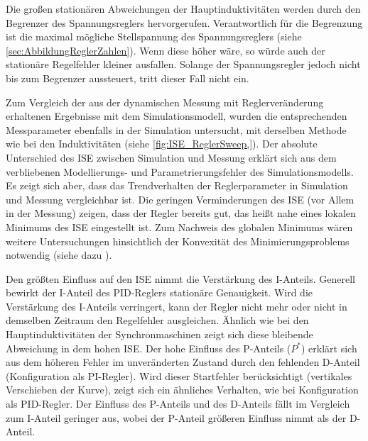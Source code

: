 Die großen stationären Abweichungen der Hauptinduktivitäten werden durch den Begrenzer des Spannungsreglers hervorgerufen. Verantwortlich für die Begrenzung ist die maximal mögliche Stellspannung des Spannungsreglers (siehe \cref{sec:AbbildungReglerZahlen}). Wenn diese höher wäre, so würde auch der stationäre Regelfehler kleiner ausfallen. Solange der Spannungsregler jedoch nicht bis zum Begrenzer aussteuert, tritt dieser Fall nicht ein.

Zum Vergleich der aus der dynamischen Messung mit Reglerveränderung erhaltenen Ergebnisse mit dem Simulationsmodell, wurden die entsprechenden Messparameter ebenfalls in der Simulation untersucht, mit derselben Methode wie bei den Induktivitäten (siehe \cref{fig:ISE_ReglerSweep,}). Der absolute Unterschied des ISE zwischen Simulation und Messung erklärt sich aus dem verbliebenen Modellierungs- und Parametrierungsfehler des Simulationsmodells. Es zeigt sich aber, dass das Trendverhalten der Reglerparameter in Simulation und Messung vergleichbar ist. Die geringen Verminderungen des ISE (vor Allem in der Messung) zeigen, dass der Regler bereits gut, das heißt nahe eines lokalen Minimums des ISE eingestellt ist. Zum Nachweis des globalen Minimums wären weitere Untersuchungen hinsichtlich der Konvexität des Minimierungsproblems notwendig (siehe dazu \cite{eschVerfahrenZurGuteoptimalen2016}).

Den größten Einfluss auf den ISE nimmt die Verstärkung des I-Anteils. Generell bewirkt der I-Anteil des PID-Reglers stationäre Genauigkeit. Wird die Verstärkung des I-Anteils verringert, kann der Regler nicht mehr oder nicht in demselben Zeitraum den Regelfehler ausgleichen. Ähnlich wie bei den Hauptinduktivitäten der Synchronmaschinen zeigt sich diese bleibende Abweichung in dem hohen ISE. Der hohe Einfluss des P-Anteils ($P^*$) erklärt sich aus dem höheren Fehler im unveränderten Zustand durch den fehlenden D-Anteil (Konfiguration als PI-Regler). Wird dieser Startfehler berücksichtigt (vertikales Verschieben der Kurve), zeigt sich ein ähnliches Verhalten, wie bei Konfiguration als PID-Regler. Der Einfluss des P-Anteils und des D-Anteils fällt im Vergleich zum I-Anteil geringer aus, wobei der P-Anteil größeren Einfluss nimmt als der D-Anteil.

